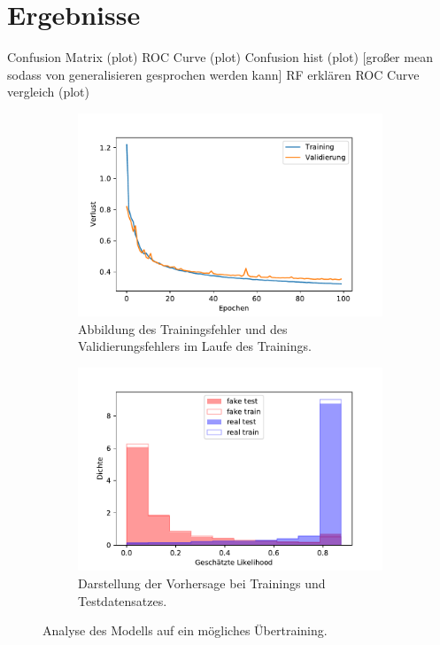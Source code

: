 \chapter{Ergebnisse}
Confusion Matrix (plot)
ROC Curve (plot)
Confusion hist (plot) [großer mean sodass von generalisieren gesprochen werden kann]
RF erklären 
ROC Curve vergleich (plot)

\begin{figure}[t!]
    \centering
    \begin{subfigure}[t]{0.49\textwidth}
        \centering
        \includegraphics[width=\textwidth]{pictures/history_bow_best.pdf}
        \caption{Abbildung des Trainingsfehler und des Validierungsfehlers im Laufe des Trainings.}
        \label{fig:history}
    \end{subfigure}
    \begin{subfigure}[t]{0.49\textwidth}
        \centering
        \includegraphics[width=\textwidth]{pictures/prob_bow_best_nn.pdf}
        \caption{Darstellung der Vorhersage bei Trainings und Testdatensatzes.}
        \label{fig:probs}
    \end{subfigure}
    \caption{Analyse des Modells auf ein mögliches Übertraining.}
\end{figure}

